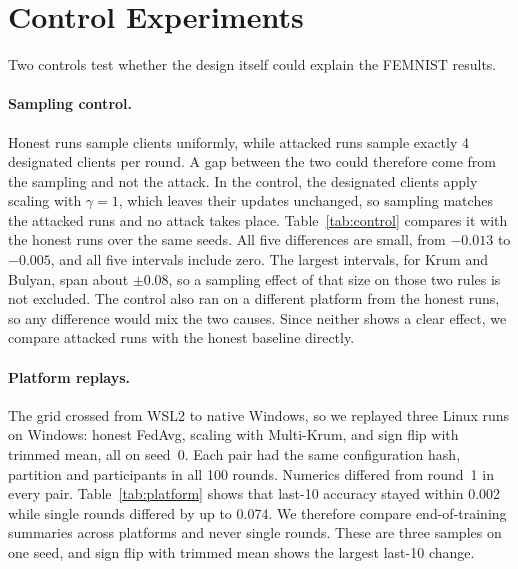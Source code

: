\section{Control Experiments}
\label{sec:ablations}

Two controls test whether the design itself could explain the FEMNIST results.

\paragraph{Sampling control.}
Honest runs sample clients uniformly, while attacked runs sample exactly 4 designated clients per round. A gap between the two could therefore come from the sampling and not the attack. In the control, the designated clients apply scaling with $\gamma=1$, which leaves their updates unchanged, so sampling matches the attacked runs and no attack takes place. Table~\ref{tab:control} compares it with the honest runs over the same seeds. All five differences are small, from $-0.013$ to $-0.005$, and all five intervals include zero. The largest intervals, for Krum and Bulyan, span about $\pm0.08$, so a sampling effect of that size on those two rules is not excluded. The control also ran on a different platform from the honest runs, so any difference would mix the two causes. Since neither shows a clear effect, we compare attacked runs with the honest baseline directly.

\begin{table}[H]
\centering
\caption{No-op control against honest runs: FEMNIST last-10 accuracy, paired by seed, with a two-sided 95\% $t$ interval on 2 degrees of freedom.}
\label{tab:control}

\end{table}

\paragraph{Platform replays.}
The grid crossed from WSL2 to native Windows, so we replayed three Linux runs on Windows: honest FedAvg, scaling with Multi-Krum, and sign flip with trimmed mean, all on seed~0. Each pair had the same configuration hash, partition and participants in all 100 rounds. Numerics differed from round~1 in every pair. Table~\ref{tab:platform} shows that last-10 accuracy stayed within 0.002 while single rounds differed by up to 0.074. We therefore compare end-of-training summaries across platforms and never single rounds. These are three samples on one seed, and sign flip with trimmed mean shows the largest last-10 change.


